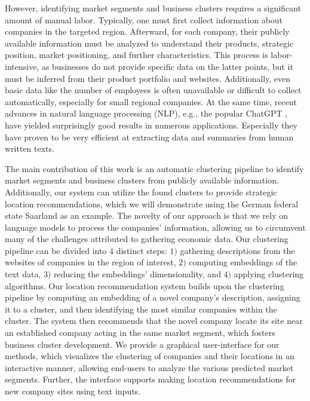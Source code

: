 \documentclass[12pt]{article}
\begin{document}
   However, identifying market segments and business clusters requires a significant amount of manual labor. Typically, one must first collect information about companies in the targeted region. Afterward, for each company, their publicly available information must be analyzed to understand their products, strategic position, market positioning, and further characteristics. 
   This process is labor-intensive, as businesses do not provide specific data on the latter points, but it must be inferred from their product portfolio and websites. Additionally, even basic data like the number of employees is often unavailable or difficult to collect automatically, especially for small regional companies.
   At the same time, recent advances in natural language processing (NLP), e.g., the popular ChatGPT \cite{chatgpt}, have yielded surprisingly good results in numerous applications. Especially they have proven to be very efficient at extracting data and summaries from human written texts.
   
   The main contribution of this work is an automatic clustering pipeline to identify market segments and business clusters from publicly available information. Additionally, our system can utilize the found clusters to provide strategic location recommendations, which we will demonstrate using the German federal state Saarland as an example. The novelty of our approach is that we rely on language models to process the companies' information, allowing us to circumvent many of the challenges attributed to gathering economic data. 
   Our clustering pipeline can be divided into $4$ distinct steps: $1)$ gathering descriptions from the websites of companies in the region of interest, $2)$ computing embeddings of the text data, $3)$ reducing the embeddings' dimensionality, and $4)$ applying clustering algorithms.
   Our location recommendation system builds upon the clustering pipeline by computing an embedding of a novel company's description, assigning it to a cluster, and then identifying the most similar companies within the cluster. The system then recommends that the novel company locate its site near an established company acting in the same market segment, which fosters business cluster development.
   We provide a graphical user-interface for our methods, which visualizes the clustering of companies and their locations in an interactive manner, allowing end-users to analyze the various predicted market segments. Further, the interface supports making location recommendations for new company sites using text inputs.
   
\end{document}
